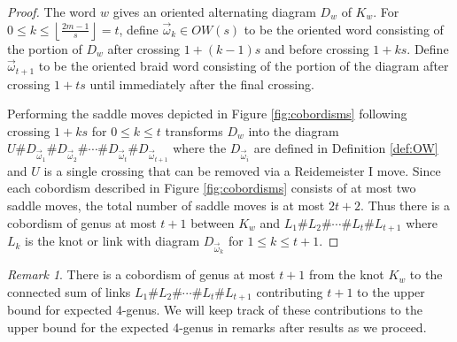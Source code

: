 \documentclass[12pt]{amsart}
\theoremstyle{definition}
\theoremstyle{remark}
\newtheorem{remark}[theorem]{Remark}
\numberwithin{equation}{section}
\begin{document}
\begin{proof}
The word $w$ gives an oriented alternating diagram $D_w$ of $K_w$. For $0\leq k \leq \left\lfloor\frac{2m-1}{s}\right\rfloor=t$, define $\vec{\omega}_k\in OW(s)$ to be the oriented word consisting of the portion of $D_w$ after crossing $1+(k-1)s$ and before crossing $1+ks$. Define $\vec{\omega}_{t+1}$ to be the oriented braid word consisting of the portion of the diagram after crossing $1+ts$ until immediately after the final crossing.  

Performing the saddle moves depicted in Figure \ref{fig:cobordisms} following crossing $1+ks$ for $0\leq k \leq t$ transforms $D_w$ into the diagram $U\#D_{\vec{\omega}_1}\# D_{\vec{\omega}_2}\#\cdots\# D_{\vec{\omega}_t}\#D_{\vec{\omega}_{t+1}}$ where the $D_{\vec{\omega}_i}$ are defined in Definition \ref{def:OW} and $U$ is a single crossing that can be removed via a Reidemeister I move. Since each cobordism described in Figure \ref{fig:cobordisms} consists of at most two saddle moves, the total number of saddle moves is at most $2t+2$. Thus there is a cobordism of genus at most $t+1$ between $K_w$ and $L_1\# L_2\# \cdots \# L_t \# L_{t+1}$ where  $L_k$ is the knot or link with diagram $D_{\vec{\omega}_k}$ for $1\leq k \leq t+1$.

\end{proof}



\begin{remark}
\label{rem:cutting}
There is a cobordism of genus at most $t+1$ from the knot $K_w$ to the connected sum of links $L_1\#L_2\# \cdots \# L_t \# L_{t+1}$ contributing $t+1$ to the upper bound for expected 4-genus. We will keep track of these contributions to the upper bound for the expected 4-genus in remarks after results as we proceed.
\end{remark}
\end{document}
